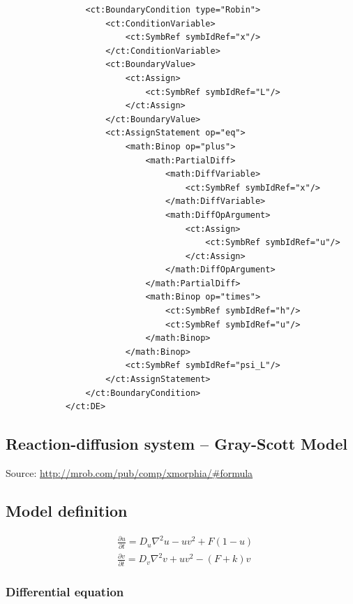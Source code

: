 \begin{lstlisting}
                <ct:BoundaryCondition type="Robin">
                    <ct:ConditionVariable>
                        <ct:SymbRef symbIdRef="x"/>
                    </ct:ConditionVariable>
                    <ct:BoundaryValue>
                        <ct:Assign>
                            <ct:SymbRef symbIdRef="L"/>
                        </ct:Assign>
                    </ct:BoundaryValue>
                    <ct:AssignStatement op="eq">
                        <math:Binop op="plus">
                            <math:PartialDiff>
                                <math:DiffVariable>
                                    <ct:SymbRef symbIdRef="x"/>
                                </math:DiffVariable>
                                <math:DiffOpArgument>
                                    <ct:Assign>
                                        <ct:SymbRef symbIdRef="u"/>
                                    </ct:Assign>
                                </math:DiffOpArgument>
                            </math:PartialDiff>
                            <math:Binop op="times">
                                <ct:SymbRef symbIdRef="h"/>
                                <ct:SymbRef symbIdRef="u"/>
                            </math:Binop>
                        </math:Binop>
                        <ct:SymbRef symbIdRef="psi_L"/>
                    </ct:AssignStatement>
                </ct:BoundaryCondition>
            </ct:DE>
 \end{lstlisting}


\bigskip
\subsection{Reaction-diffusion system -- Gray-Scott Model}
\label{sec:RDsystemEq}
Source: \url{http://mrob.com/pub/comp/xmorphia/#formula}

\subsection*{Model definition}

\begin{align}
& \frac{\partial u}{\partial t}  = D_u \nabla^2 u - uv^2 + F(1-u) \nonumber \\
& \frac{\partial v}{\partial t}  = D_v \nabla^2 v + uv^2 - (F+k)v \nonumber
\end{align}

\subsubsection*{Differential equation}

